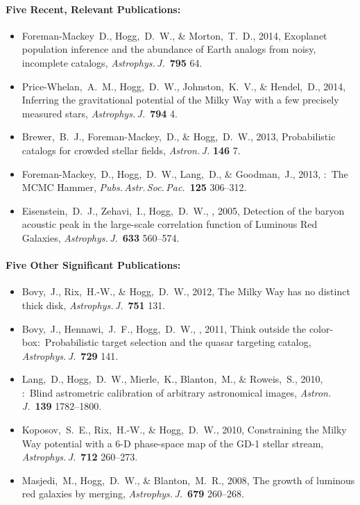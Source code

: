 \documentclass[letterpaper,12pt]{article}
\begin{document}
\paragraph{Five Recent, Relevant Publications:}
\begin{itemize}\setlength{\itemsep}{0pt}
\item
Foreman-Mackey~D., Hogg,~D.~W., \& Morton,~T.~D., 2014,
{Exoplanet population inference and the abundance of Earth analogs from noisy, incomplete catalogs},
\textit{Astrophys.\,J.}\ \textbf{795} 64.
\item
Price-Whelan,~A.~M., Hogg,~D.~W., Johnston,~K.~V., \& Hendel,~D., 2014,
{Inferring the gravitational potential of the Milky Way with a few precisely measured stars},
\textit{Astrophys.\,J.}\ \textbf{794} 4.
\item
Brewer,~B.~J., Foreman-Mackey,~D., \& Hogg,~D.~W., 2013,
{Probabilistic catalogs for crowded stellar fields},
\textit{Astron.\,J.} \textbf{146} 7.
\item
Foreman-Mackey,~D., Hogg,~D.~W., Lang,~D., \& Goodman,~J., 2013,
{:\ The MCMC Hammer},
\textit{Pubs.\,Astr.\,Soc.\,Pac.}\ \textbf{125} 306--312.
\item
Eisenstein,~D.~J., Zehavi,~I., Hogg,~D.~W., \etal, 2005,
{Detection of the baryon acoustic peak in the large-scale correlation function of  Luminous Red Galaxies},
\textit{Astrophys.\,J.}\ \textbf{633} 560--574.
\end{itemize}

\paragraph{Five Other Significant Publications:}
\begin{itemize}\setlength{\itemsep}{0pt}
\item
Bovy,~J., Rix,~H.-W., \& Hogg,~D.~W., 2012,
{The Milky Way has no distinct thick disk},
\textit{Astrophys.\,J.}\ \textbf{751} 131.
\item
Bovy,~J., Hennawi,~J.~F., Hogg,~D.~W., \etal, 2011,
{Think outside the color-box:\ Probabilistic target selection and the  quasar targeting catalog},
\textit{Astrophys.\,J.}\ \textbf{729} 141.
\item
Lang,~D., Hogg,~D.~W., Mierle,~K., Blanton,~M., \& Roweis,~S., 2010,
{:\ Blind astrometric calibration of arbitrary astronomical images},
\textit{Astron.\,J.}\ \textbf{139} 1782--1800.
\item
Koposov,~S.~E., Rix,~H.-W., \& Hogg,~D.~W., 2010,
{Constraining the Milky Way potential with a 6-D phase-space map of the GD-1 stellar stream},
\textit{Astrophys.\,J.}\ \textbf{712} 260--273.
\item
Masjedi,~M., Hogg,~D.~W., \& Blanton,~M.~R., 2008,
{The growth of luminous red galaxies by merging},
\textit{Astrophys.\,J.}\ \textbf{679} 260--268.
\end{itemize}
\end{document}
